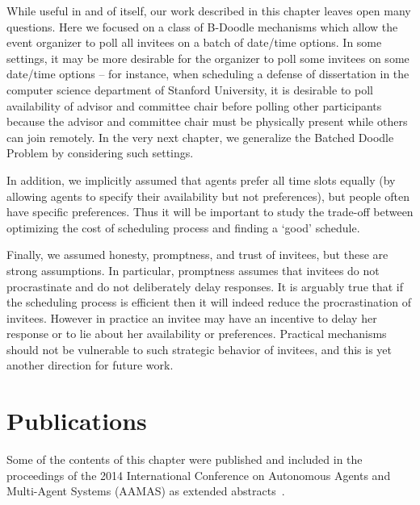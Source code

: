 While useful in and of itself, our work described in this chapter leaves open many questions.
Here we focused on a class of B-Doodle mechanisms which allow the event organizer to poll all invitees on a batch of date/time options. In some settings, it may be more desirable for the organizer to poll some invitees on some date/time options -- for instance, when scheduling a defense of dissertation in the computer science department of Stanford University, it is desirable to poll availability of advisor and committee chair before polling other participants because the advisor and committee chair must be physically present while others can join remotely. In the very next chapter, we generalize the Batched Doodle Problem by considering such settings. 

In addition, we implicitly assumed that agents prefer all time slots equally (by
allowing agents to specify their availability but not preferences),
but people often have specific preferences. Thus it will be important
to study the trade-off between optimizing the cost of scheduling
process and finding a `good' schedule.

Finally, we assumed honesty, promptness, and trust of invitees, but
these are strong assumptions. In particular, promptness assumes that
invitees do not procrastinate and do not deliberately delay responses.
It is arguably true that if the scheduling process is efficient then
it will indeed reduce the procrastination of invitees. However in
practice an invitee may have an incentive to delay her response or to
lie about her availability or preferences. Practical mechanisms should
not be vulnerable to such strategic behavior of invitees, and this is
yet another direction for future work.

\section*{Publications}
Some of the contents of this chapter were published and included in the proceedings of the 2014 International Conference on Autonomous Agents and Multi-Agent Systems (AAMAS) as extended abstracts~\cite{lee2014algorithmic,lee14doodle}.
